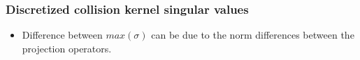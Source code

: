 \documentclass[mathserif, aspectratio=169]{beamer}
\begin{document}
\begin{frame}
	\frametitle{Discretized collision kernel singular values}
\begin{itemize}
	\item Difference between $max(\sigma)$ can be due to the norm differences between the projection operators.
\end{itemize}
\end{frame}
\end{document}
